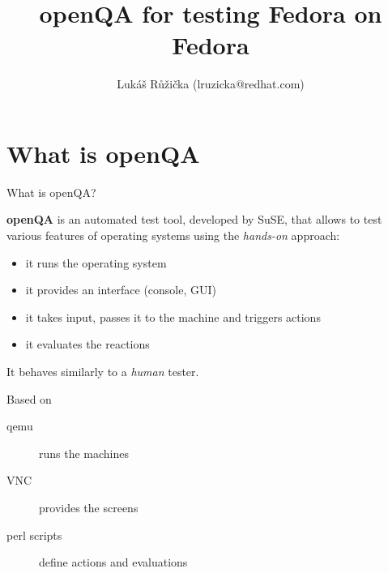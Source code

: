 \documentclass[12pt,aspectratio=169]{beamer}
\begin{document}
	\author{Lukáš Růžička (lruzicka@redhat.com)}
	\title{openQA for testing Fedora on Fedora}
	\date{}

\begin{frame}[plain]
	\maketitle 
\end{frame}

\section{What is openQA}

\begin{frame}{What is openQA?}

\textbf{openQA} is an automated test tool, developed by SuSE, that allows to test various features of operating systems using the \textit{hands-on} approach:

\vspace{15pt}

\begin{itemize}
\item it runs the operating system
\item it provides an interface (console, GUI)
\item it takes input, passes it to the machine and triggers actions
\item it evaluates the reactions
\end{itemize}

\vspace{15pt}

It behaves similarly to a \textit{human} tester.
\end{frame}

\begin{frame}{Based on}
	
	\begin{description}
		\item[qemu] runs the machines
		\item[VNC] provides the screens
		\item[perl scripts] define actions and evaluations
	\end{description}
\end{frame}
\end{document}
